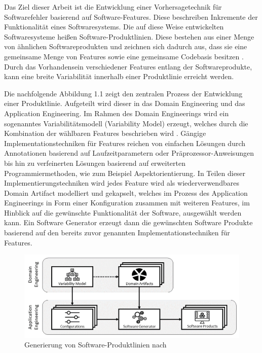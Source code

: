 Das Ziel dieser Arbeit ist die Entwicklung einer Vorhersagetechnik für Softwarefehler basierend auf Software-Features. Diese beschreiben Inkremente der Funktionalität eines Softwaresystems. Die auf diese Weise entwickelten Softwaresysteme heißen Software-Produktlinien. Diese bestehen aus einer Menge von ähnlichen Softwareprodukten und zeichnen sich dadurch aus, dass sie eine gemeinsame Menge von Features sowie eine gemeinsame Codebasis besitzen \cite{Thuem2014}. Durch das Vorhandensein verschiedener Features entlang der Softwareprodukte, kann eine breite Variabilität innerhalb einer Produktlinie erreicht werden. 

Die nachfolgende Abbildung 1.1 zeigt den zentralen Prozess der Entwicklung einer Produktlinie. Aufgeteilt wird dieser in das Domain Engineering und das Application Engineering. Im Rahmen des Domain Engineerings wird ein sogenanntes Variabilitätsmodell (Variability Model) erzeugt, welches durch die Kombination der wählbaren Features beschrieben wird \cite{Apel2013}. Gängige Implementationstechniken für Features reichen von einfachen Lösungen durch Annotationen basierend auf Laufzeitparametern oder Präprozessor-Anweisungen bis hin zu verfeinerten Lösungen basierend auf erweiterten Programmiermethoden, wie zum Beispiel Aspektorientierung. In Teilen dieser Implementierungstechniken wird jedes Feature wird als wiederverwendbares Domain Artifact modelliert und gekapselt, welches im Prozess des Application Engineerings in Form einer Konfiguration zusammen mit weiteren Features, im Hinblick auf die gewünschte Funktionalität der Software, ausgewählt werden kann. Ein Software Generator erzeugt dann die gewünschten Software Produkte basierend auf den bereits zuvor genannten Implementationstechniken für Features.

\begin{figure}[H]
    \centering
    \includegraphics[width=\textwidth]{images/SPL}
    \caption{Generierung von Software-Produktlinien nach \cite{Thuem2014}\label{fig:spl}}
\end{figure}
 
